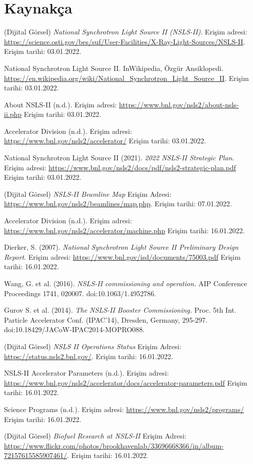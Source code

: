 \documentclass{article}
\begin{document}
\newpage
\section{Kaynakça}

	\begin{thebibliography}{99}
	 (Dijital Görsel) \textit{National Synchrotron Light Source II (NSLS-II)}. Erişim adresi: \url{https://science.osti.gov/bes/suf/User-Facilities/X-Ray-Light-Sources/NSLS-II}. Erişim tarihi: 03.01.2022.
	
	 National Synchrotron Light Source II. InWikipedia, Özgür Ansiklopedi. \url{https://en.wikipedia.org/wiki/National_Synchrotron_Light_Source_II}. Erişim tarihi: 03.01.2022.  
	
	 About NSLS-II (n.d.). Erişim adresi: \url{https://www.bnl.gov/nsls2/about-nsls-ii.php} Erişim tarihi: 03.01.2022.
	
	 Accelerator Division (n.d.). Erişim adresi: \url{https://www.bnl.gov/nsls2/accelerator/} Erişim tarihi: 03.01.2022.
	
	 National Synchrotron Light Source II (2021). \textit{2022 NSLS-II Strategic Plan}. Erişim adresi: \url{https://www.bnl.gov/nsls2/docs/pdf/nsls2-strategic-plan.pdf} Erişim tarihi: 03.01.2022.
	
	 (Dijital Görsel) \textit{NSLS-II Beamline Map} Erişim Adresi: \url{https://www.bnl.gov/nsls2/beamlines/map.php}. Erişim tarihi: 07.01.2022.
	
	  Accelerator Division (n.d.). Erişim adresi: \url{https://www.bnl.gov/nsls2/accelerator/machine.php} Erişim tarihi: 16.01.2022.
	 
	   Dierker, S. (2007). \textit{National Synchrotron Light Source II
Preliminary Design Report}. Erişim adresi: \url{https://www.bnl.gov/isd/documents/75003.pdf} Erişim tarihi: 16.01.2022.
	
	
	 Wang, G. et al. (2016). \textit{NSLS-II commissioning and operation.} AIP Conference Proceedings 1741, 020007. doi:10.1063/1.4952786.
	
	 Gurov S. et al. (2014). \textit{The NSLS-II Booster Commissioning.}  Proc. 5th Int. Particle Accelerator Conf. (IPAC'14), Dresden, Germany, 295-297. doi:10.18429/JACoW-IPAC2014-MOPRO088.
	
	 (Dijital Görsel) \textit{NSLS II Operations Status} Erişim Adresi: \url{https://status.nsls2.bnl.gov/}. Erişim tarihi: 16.01.2022.
	
	  NSLS-II Accelerator Parameters (n.d.). Erişim adresi: \url{https://www.bnl.gov/nsls2/accelerator/docs/accelerator-parameters.pdf} Erişim tarihi: 16.01.2022.

    Science Programs (n.d.). Erişim adresi: \url{https://www.bnl.gov/nsls2/programs/} Erişim tarihi: 16.01.2022.
   
    (Dijital Görsel) \textit{Biofuel Research at NSLS-II} Erişim Adresi: \url{https://www.flickr.com/photos/brookhavenlab/33696668366/in/album-72157615585907461/}.
   Erişim tarihi: 16.01.2022.
   

	\end{thebibliography}
	
\end{document}
